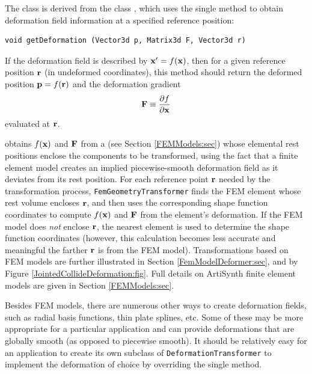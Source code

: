 The 
class is derived from the
class , which uses
the single method
 to
obtain deformation field information at a specified reference position:
%
\begin{lstlisting}[]
    void getDeformation (Vector3d p, Matrix3d F, Vector3d r)
\end{lstlisting}
%
If the deformation field is described by ${\bf x}' = f({\bf x})$, then
for a given reference position ${\bf r}$ (in undeformed coordinates),
this method should return the deformed position ${\bf p} = f({\bf r})$
and the deformation gradient
%
\begin{equation}
{\bf F} \equiv \frac{\partial f}{\partial {\bf x}}
\end{equation}
%
evaluated at ${\bf r}$. 

 obtains
$f({\bf x})$ and ${\bf F}$ from a
 (see Section
\ref{FEMModels:sec}) whose elemental rest positions enclose the
components to be transformed, using the fact that a finite element
model creates an implied piecewise-smooth deformation field as it
deviates from its rest position. For each reference point ${\bf r}$ needed
by the transformation process, {\tt FemGeometryTransformer} finds the
FEM element whose rest volume encloses ${\bf r}$, and then uses the
corresponding shape function coordinates to compute $f({\bf x})$ and ${\bf F}$
from the element's deformation. If the FEM model does {\it not}
enclose ${\bf r}$, the nearest element is used to determine the shape
function coordinates (however, this calculation becomes less accurate and
meaningful the farther ${\bf r}$ is from the FEM model). Transformations based
on FEM models are further illustrated in Section
\ref{FemModelDeformer:sec}, and by Figure
\ref{JointedCollideDeformation:fig}. Full details on ArtiSynth finite
element models are given in Section \ref{FEMModels:sec}.

Besides FEM models, there are numerous other ways to create
deformation fields, such as radial basis functions, thin plate
splines, etc. Some of these may be more appropriate for a particular
application and can provide deformations that are globally smooth (as
opposed to piecewise smooth).  It should be relatively easy for an
application to create its own subclass of {\tt DeformationTransformer}
to implement the deformation of choice by overriding the single
method.

